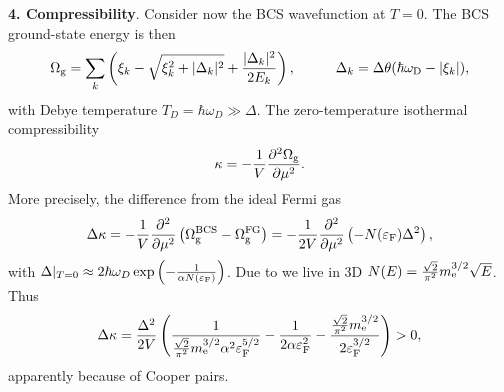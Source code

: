 \textbf{4. Compressibility}. Consider now the BCS wavefunction at $T=0$. The BCS ground-state energy is then
\begin{equation*}
	\sub{\Omega}{g} = \sum_k \left(\xi_k - \sqrt{\xi_k^2 + |\Delta_k|^2} + \frac{|\Delta_k|^2}{2 E_k}\right),
	\hspace{10 mm} 
	\Delta_k = \Delta \theta(\hbar \sub{\omega}{D} - |\xi_k|),
\end{equation*}
with Debye temperature $T_D = \hbar \omega_D \gg \Delta$.  The zero-temperature isothermal compressibility
\begin{equation*}
	\kappa = - \frac{1}{V} \frac{\partial^2 \Omega_{\textnormal{g}}}{\partial \mu^2}. 
\end{equation*}
More precisely, the difference from the ideal Fermi gas
\begin{equation*}
	\Delta \kappa = - \frac{1}{V} \frac{\partial^2 }{\partial \mu^2} \left(\Omega_{\textnormal{g}}^\text{BCS} - \Omega_{\textnormal{g}}^\text{FG}\right) =  - \frac{1}{2V} \frac{\partial^2 }{\partial \mu^2} \left( -N(\varepsilon_{\textnormal{F}}) \Delta^2 \right),
\end{equation*}
with $\Delta |_{T=0} \approx 2 \hbar \omega_D \exp\left(- \frac{1}{\alpha N(\varepsilon_{\textnormal{F}})}\right)$. Due to we live in 3D $N(E) = \frac{\sqrt{2}}{\pi^2} m_{\textnormal{e}}^{3/2} \sqrt{E}$.  Thus
\begin{equation*}
	\Delta \kappa = \frac{\Delta^2}{2V}\left(
		\frac{1}{\frac{\sqrt{2}}{\pi^2} m_{\textnormal{e}}^{3/2} \alpha^2 \varepsilon_{\textnormal{F}}^{5/2} } - \frac{1}{2 \alpha \varepsilon_{\textnormal{F}}^2 } - \frac{\frac{\sqrt{2}}{\pi^2} m_{\textnormal{e}}^{3/2}}{2 \varepsilon_{\textnormal{F}}^{3/2}}
	\right) > 0,
\end{equation*}
apparently because of Cooper pairs. 


